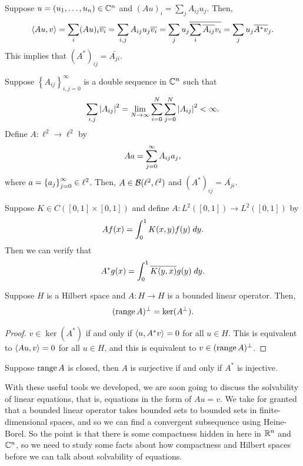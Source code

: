 \documentclass[a4paper]{article}
\begin{document}
\begin{eg}
Suppose $u = (u_1, \dots, u_n) \in \mathbb{C}^n$ 
and $(A u)_i = \sum_j A_{ij} u_j$.
Then, 
\[
\left\langle A u, v \right\rangle = \sum_i (A u)_i \overline{v_i} 
= \sum_{i, j} A_{ij} u_j \overline{v_i} 
= \sum_j u_j \overline{\sum_i \overline{A_{ij}} v_i} 
= \sum_j u_j \overline{A^* v}_j.
\]
This implies that $(A^*)_{ij} = \bar{A_{ji}}$.
\end{eg}

\begin{eg}
Suppose $\left\{ A_{ij} \right\}_{i, j = 0}^\infty$ 
is a double sequence in $\mathbb{C}^n$ such that 
\[
\sum_{i, j} \left\lvert A_{ij}\right\rvert^2 = \lim_{N \to \infty}
\sum_{i=0}^N \sum_{j=0}^N \left\lvert A_{ij}\right\rvert^2 < \infty.
\]
Define $A : \ell^2 \to \ell^2$ by 
\[
A a = \sum_{j=0}^\infty A_{ij} a_j,
\]
where $a = \left\{ a_j \right\}_{j=0}^\infty \in \ell^2$. Then, 
$A \in \mathcal{B}(\ell^2, \ell^2)$ and 
$(A^*)_{ij} = \bar{A_{ji}}$.
\end{eg}

\begin{eg}
Suppose $K \in C([0, 1] \times [0, 1])$ and define 
$A : L^2 ([0, 1]) \to L^2 ([0, 1])$ by 
\[
A f(x) = \int_0^1 K(x, y) f(y) \; d y.
\]
Then we can verify that 
\[
A^* g(x) = \int_0^1 \overline{K(y, x)} g(y) \; d y.
\]
\end{eg}

\begin{thm}
Suppose $H$ is a Hilbert space and $A : H \to H$
is a bounded linear operator. Then, 
\[
(\operatorname{range} A)^\perp = \ker (A^\perp).
\]
\end{thm}

\begin{proof}
$v \in \ker (A^*)$ if and only if $\left\langle u, A^* v \right\rangle = 0$
for all $u \in H$. This is equivalent to 
$\left\langle A u, v \right\rangle = 0$ for all $u \in H$, and 
this is equivalent to $v \in (\operatorname{range} A)^\perp$.
\end{proof}

\begin{cor}
  Suppose $\operatorname{range} A$ is closed, then 
  $A$ is surjective if and only if 
  $A^*$ is injective.
\end{cor}

With these useful tools we developed,
we are soon going to discuss the solvability of linear 
equations, that is, equations in the form of $Au = v$.
We take for granted that a bounded linear operator takes 
bounded sets to bounded sets in finite-dimensional spaces, 
and so we can find a convergent subsequence using Heine-Borel. 
So the point is that there is some compactness hidden in 
here in $\mathbb{R}^n$ and $\mathbb{C}^n$, so we need to study some facts 
about how compactness and Hilbert spaces before we can talk 
about solvability of equations.
\end{document}
